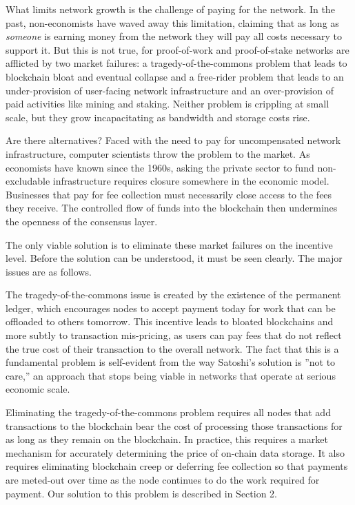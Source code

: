 \documentclass[11pt, oneside]{article}   	%
\begin{document}
\begin{multicols}{2}
What limits network growth is the challenge of paying for the network. In the past, non-economists have waved away this limitation, claiming that as long as {\textit{someone}} is earning money from the network they will pay all costs necessary to support it. But this is not true, for proof-of-work and proof-of-stake networks are afflicted by two market failures:  a tragedy-of-the-commons problem that leads to blockchain bloat and eventual collapse and a free-rider problem that leads to an under-provision of user-facing network infrastructure and an over-provision of paid activities like mining and staking. Neither problem is crippling at small scale, but they grow incapacitating as bandwidth and storage costs rise.

Are there alternatives? Faced with the need to pay for uncompensated network infrastructure, computer scientists throw the problem to the market. As economists have known since the 1960s, asking the private sector to fund non-excludable infrastructure requires closure somewhere in the economic model. Businesses that pay for fee collection must necessarily close access to the fees they receive. The controlled flow of funds into the blockchain then undermines the openness of the  consensus layer. 

The only viable solution is to eliminate these market failures on the incentive level. Before the solution can be understood, it must be seen clearly. The major issues are as follows.

The tragedy-of-the-commons issue is created by the existence of the permanent ledger, which encourages nodes to accept payment today for work that can be offloaded to others tomorrow.  This incentive leads to bloated blockchains and more subtly to transaction mis-pricing, as users can pay fees that do not reflect the true cost of their transaction to the overall network. The fact that this is a fundamental problem is self-evident from the way Satoshi’s solution is ”not to care,” an approach that stops being viable in networks that operate at serious economic scale.

Eliminating the tragedy-of-the-commons problem requires all nodes that add transactions to the blockchain bear the cost of processing those transactions for as long as they remain on the blockchain. In practice, this requires a market mechanism for accurately determining the price of on-chain data storage. It also requires eliminating blockchain creep or deferring fee collection so that payments are meted-out over time as the node continues to do the work required for payment. Our solution to this problem is described in Section 2.


\end{multicols}
\end{document}
